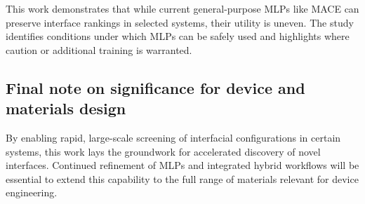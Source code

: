 This work demonstrates that while current general-purpose MLPs like MACE can preserve interface rankings in selected systems, their utility is uneven. The study identifies conditions under which MLPs can be safely used and highlights where caution or additional training is warranted.

\subsection{Final note on significance for device and materials design}

By enabling rapid, large-scale screening of interfacial configurations in certain systems, this work lays the groundwork for accelerated discovery of novel interfaces. Continued refinement of MLPs and integrated hybrid workflows will be essential to extend this capability to the full range of materials relevant for device engineering.


